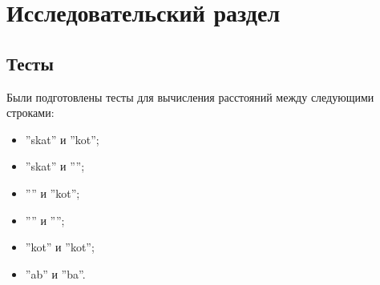 \chapter{Исследовательский раздел}
\section{Тесты}

Были подготовлены тесты для вычисления расстояний между следующими строками:
\begin{itemize}
	\item ''skat'' и ''kot'';
	\item ''skat'' и '''';
	\item '''' и ''kot'';
	\item '''' и '''';
	\item ''kot'' и ''kot'';
	\item ''ab'' и ''ba''.
\end{itemize}


